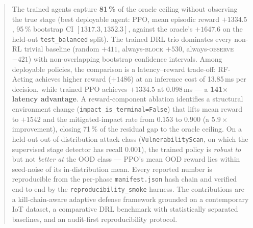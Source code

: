 \documentclass[Ingles,Final]{thesis}
\begin{document}
\begin{abstract}
The trained agents capture \textbf{81\,\%} of the oracle ceiling without observing the true stage (best deployable agent: PPO, mean episodic reward $+1334.5$, 95\,\% bootstrap CI $[1317.3, 1352.3]$, against the oracle's $+1647.6$ on the held-out \texttt{test\_balanced} split). The trained DRL trio dominates every non-RL trivial baseline (random $+411$, always-\textsc{block} $+530$, always-\textsc{observe} $-421$) with non-overlapping bootstrap confidence intervals. Among deployable policies, the comparison is a latency--reward trade-off: RF-Acting achieves higher reward ($+1486$) at an inference cost of 13.85\,ms per decision, while trained PPO achieves $+1334.5$ at 0.098\,ms --- a \textbf{141$\times$ latency advantage}. A reward-component ablation identifies a structural environment change (\texttt{impact\_is\_terminal=False}) that lifts mean reward to $+1542$ and the mitigated-impact rate from $0.153$ to $0.900$ (a $5.9\times$ improvement), closing 71\,\% of the residual gap to the oracle ceiling. On a held-out out-of-distribution attack class (\texttt{VulnerabilityScan}, on which the supervised stage detector has recall $0.001$), the trained policy is \emph{robust to} but not \emph{better at} the OOD class --- PPO's mean OOD reward lies within seed-noise of its in-distribution mean. Every reported number is reproducible from the per-phase \texttt{manifest.json} hash chain and verified end-to-end by the \texttt{reproducibility\_smoke} harness. The contributions are a kill-chain-aware adaptive defense framework grounded on a contemporary IoT dataset, a comparative DRL benchmark with statistically separated baselines, and an audit-first reproducibility protocol.

\end{abstract}


\printnomenclature[3cm]

\tableofcontents

\cleardoublepage
\setcounter{page}{1}

\fimdaspaginasiniciais







\newpage
\begin{singlespacing}
\setlength\bibitemsep{10pt}
\printbibliography[heading=bibintoc, title={References}]
\end{singlespacing}

\newpage
\appendix

\end{document}
